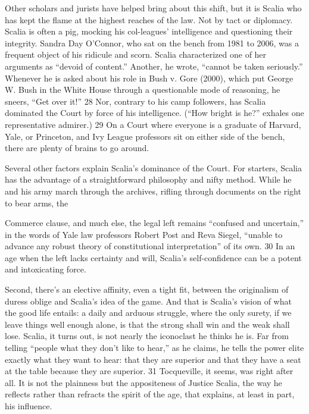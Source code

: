  \par 
Other scholars and jurists have helped bring about this shift, but it is Scalia who has kept the flame at the highest reaches of the law. Not by tact or diplomacy. Scalia is often a pig, mocking his col-leagues’ intelligence and questioning their integrity. Sandra Day O’Connor, who sat on the bench from 1981 to 2006, was a frequent object of his ridicule and scorn. Scalia characterized one of her arguments as “devoid of content.” Another, he wrote, “cannot be taken seriously.” Whenever he is asked about his role in Bush v. Gore (2000), which put George W. Bush in the White House through a questionable mode of reasoning, he sneers, “Get over it!” {\color{blue}28} Nor, contrary to his camp followers, has Scalia dominated the Court by force of his intelligence. (“How bright is he?” exhales one representative admirer.) {\color{blue}29} On a Court where everyone is a graduate of Harvard, Yale, or Princeton, and Ivy League professors sit on either side of the bench, there are plenty of brains to go around.
 \par 
Several other factors explain Scalia’s dominance of the Court. For starters, Scalia has the advantage of a straightforward philosophy and nifty method. While he and his army march through the archives, rifling through documents on the right to bear arms, the
 \par 
Commerce clause, and much else, the legal left remains “confused and uncertain,” in the words of Yale law professors Robert Post and Reva Siegel, “unable to advance any robust theory of constitutional interpretation” of its own. {\color{blue}30} In an age when the left lacks certainty and will, Scalia’s self-confidence can be a potent and intoxicating force.
 \par 
Second, there’s an elective affinity, even a tight fit, between the originalism of duress oblige and Scalia’s idea of the game. And that is Scalia’s vision of what the good life entails: a daily and arduous struggle, where the only surety, if we leave things well enough alone, is that the strong shall win and the weak shall lose. Scalia, it turns out, is not nearly the iconoclast he thinks he is. Far from telling “people what they don’t like to hear,” as he claims, he tells the power elite exactly what they want to hear: that they are superior and that they have a seat at the table because they are superior. {\color{blue}31} Tocqueville, it seems, was right after all. It is not the plainness but the appositeness of Justice Scalia, the way he reflects rather than refracts the spirit of the age, that explains, at least in part, his influence.
